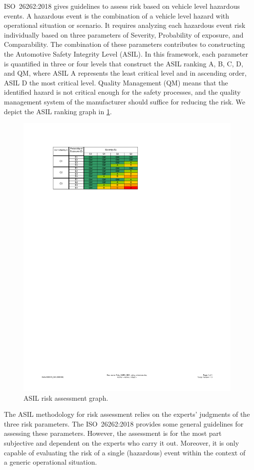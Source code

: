 ISO~26262:2018 gives guidelines to assess risk based on vehicle level hazardous events. A hazardous event is the combination of a vehicle level hazard with operational situation or scenario. It requires analyzing each hazardous event risk individually based on three parameters of Severity, Probability of exposure, and Comparability. The combination of these parameters contributes to constructing the Automotive Safety Integrity Level (ASIL). In this framework, each parameter is quantified in three or four levels that construct the ASIL ranking A, B, C, D, and QM, where ASIL A represents the least critical level and in ascending order, ASIL D the most critical level. Quality Management (QM) means that the identified hazard is not critical enough for the safety processes, and the quality management system of the manufacturer should suffice for reducing the risk. We depict the ASIL ranking graph in \cref{Fig:ASILGraph}. 

\begin{figure}[b]
	\centering
	\includegraphics[width=0.6\linewidth]{./figures/ASIL}
	\caption{ASIL risk assessment graph.}
	\label{Fig:ASILGraph}
\end{figure}

The ASIL methodology for risk assessment relies on the experts’ judgments of the three risk parameters. The ISO~26262:2018 provides some general guidelines for assessing these parameters. However, the assessment is for the most part subjective and dependent on the experts who carry it out. Moreover, it is only capable of evaluating the risk of a single (hazardous) event within the context of a generic operational situation.

